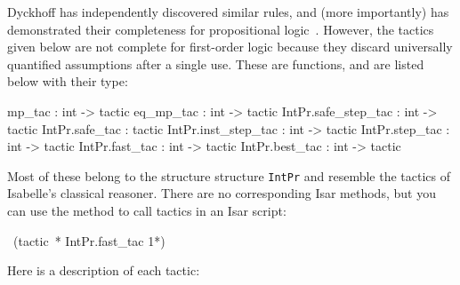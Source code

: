 Dyckhoff has independently discovered similar rules, and (more importantly)
has demonstrated their completeness for propositional
logic~\cite{dyckhoff}.  However, the tactics given below are not complete
for first-order logic because they discard universally quantified
assumptions after a single use. These are \ML{} functions, and are listed
below with their \ML{} type:
\begin{ttbox} 
mp_tac              : int -> tactic
eq_mp_tac           : int -> tactic
IntPr.safe_step_tac : int -> tactic
IntPr.safe_tac      :        tactic
IntPr.inst_step_tac : int -> tactic
IntPr.step_tac      : int -> tactic
IntPr.fast_tac      : int -> tactic
IntPr.best_tac      : int -> tactic
\end{ttbox}
Most of these belong to the structure \ML{} structure \texttt{IntPr} and resemble the
tactics of Isabelle's classical reasoner.  There are no corresponding
Isar methods, but you can use the 
 method to call \ML{} tactics in an Isar script:
\begin{isabelle}
\ (tactic\ {* IntPr.fast\_tac 1*})
\end{isabelle}
Here is a description of each tactic:

